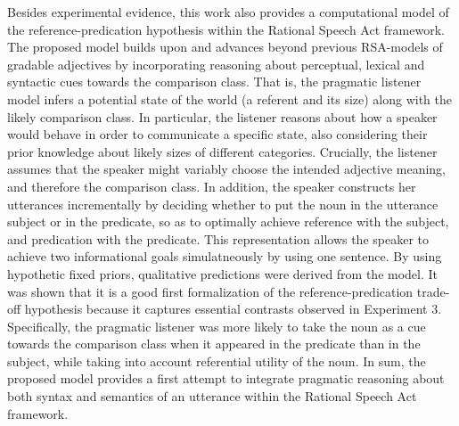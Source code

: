 Besides experimental evidence, this work also provides a computational model of the reference-predication hypothesis within the Rational Speech Act framework. The proposed model builds upon and advances beyond previous RSA-models of gradable adjectives by incorporating reasoning about perceptual, lexical and syntactic cues towards the comparison class. That is, the pragmatic listener model infers a potential state of the world (a referent and its size) along with the likely comparison class. In particular, the listener reasons about how a speaker would behave in order to communicate a specific state, also considering their prior knowledge about likely sizes of different categories. Crucially, the listener assumes that the speaker might variably choose the intended adjective meaning, and therefore the comparison class. 
In addition, the speaker constructs her utterances incrementally by deciding whether to put the noun in the utterance subject or in the predicate, so as to optimally achieve reference with the subject, and predication with the predicate. This representation allows the speaker to achieve two informational goals simulatneously by using one sentence. By using hypothetic fixed priors, qualitative predictions were derived from the model. It was shown that it is a good first formalization of the reference-predication trade-off hypothesis because it captures essential contrasts observed in Experiment 3. Specifically, the pragmatic listener was more likely to take the noun as a cue towards the comparison class when it appeared in the predicate than in the subject, while taking into account referential utility of the noun. In sum, the proposed model provides a first attempt to integrate pragmatic reasoning about both syntax and semantics of an utterance within the Rational Speech Act framework. 

